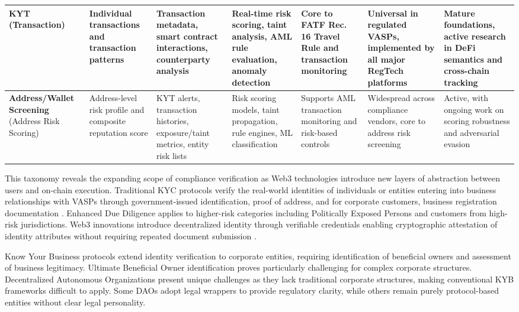 \documentclass[conference,compsoc]{IEEEtran}
\begin{document}
\begin{table}[t]
\begin{tabularx}{\textwidth}{XXXXp{2.35cm}XX}
\midrule
\textbf{KYT} (Transaction) & Individual transactions and transaction patterns \cite{moser2013inquirymoneylaundering} & Transaction metadata, smart contract interactions, counterparty analysis \cite{chen2020understandingethereumgraph} & Real-time risk scoring, taint analysis, AML rule evaluation, anomaly detection \cite{moser2014riskscoringbitcoin,monamo2016unsupervisedlearningrobust} & Core to FATF Rec. 16 Travel Rule and transaction monitoring \cite{force2021opportunitieschallengesnew} & Universal in regulated VASPs, implemented by all major RegTech platforms & Mature foundations, active research in DeFi semantics and cross-chain tracking \cite{sun2025ethereumfrauddetection,yousaf2019tracingtransactionscryptocurrency} \\
\midrule
\textbf{Address/Wallet Screening} (Address Risk Scoring) & Address-level risk profile and composite reputation score & KYT alerts, transaction histories, exposure/taint metrics, entity risk lists & Risk scoring models, taint propagation, rule engines, ML classification \cite{moser2014riskscoringbitcoin,weber2019antimoneylaunderingbitcoin} & Supports AML transaction monitoring and risk-based controls & Widespread across compliance vendors, core to address risk screening & Active, with ongoing work on scoring robustness and adversarial evasion \cite{pocher2023detectinganomalouscryptocurrency,alarab2020comparativeanalysisusing} \\
\bottomrule
\end{tabularx}
\end{table}

This taxonomy reveals the expanding scope of compliance verification as Web3 technologies introduce new layers of abstraction between users and on-chain execution. Traditional KYC protocols verify the real-world identities of individuals or entities entering into business relationships with VASPs through government-issued identification, proof of address, and for corporate customers, business registration documentation \cite{financialactiontaskforcefatf2012internationalstandardscombating}. Enhanced Due Diligence applies to higher-risk categories including Politically Exposed Persons and customers from high-risk jurisdictions. Web3 innovations introduce decentralized identity through verifiable credentials enabling cryptographic attestation of identity attributes without requiring repeated document submission \cite{reed2022decentralizedidentifiersdids,camenisch2001efficientsystemnontransferable}.

Know Your Business protocols extend identity verification to corporate entities, requiring identification of beneficial owners and assessment of business legitimacy. Ultimate Beneficial Owner identification proves particularly challenging for complex corporate structures. Decentralized Autonomous Organizations present unique challenges as they lack traditional corporate structures, making conventional KYB frameworks difficult to apply. Some DAOs adopt legal wrappers to provide regulatory clarity, while others remain purely protocol-based entities without clear legal personality.
\end{document}
